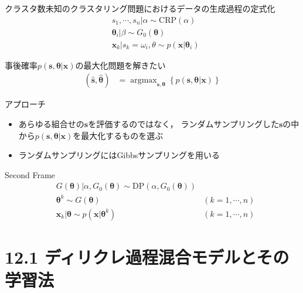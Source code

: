 \documentclass[10pt,fleqn]{beamer}
\DeclareMathOperator*{\argmax}{argmax}
\begin{document}
    \begin{frame}{クラスタ数未知のクラスタリング問題におけるデータの生成過程の定式化}
        \begin{align*}
            &s_1,\cdots,s_n | \alpha \sim \mathrm{CRP}(\alpha) \tag{12.4}\\
            &\bm\theta_i | \beta \sim G_0(\bm\theta) \tag{12.5}\\
            &\mathbf x_k | s_k = \omega_i,\theta \sim p(\mathbf x | \bm\theta_i) \tag{12.6} 
        \end{align*}
    \end{frame}
    
    \begin{frame}{事後確率$p(\mathbf s, \bm\theta | \mathbf x)$の最大化問題を解きたい}
        \begin{align*}
            (\hat{\mathbf s}, \hat{\bm\theta}) &= \argmax_{\mathbf s,\bm\theta}\left\{ p(\mathbf s, \bm\theta | \mathbf x) \right\} \tag{11.5}
        \end{align*}
        \begin{alertblock}{アプローチ}
            \begin{itemize}
                \item あらゆる組合せの$\mathbf s$を評価するのではなく，
                    ランダムサンプリングした$\mathbf s$の中から$p(\mathbf s, \bm\theta | \mathbf x)$を最大化するものを選ぶ
                \item ランダムサンプリングにはGibbsサンプリングを用いる
            \end{itemize}
        \end{alertblock}
    \end{frame}
    
    \begin{frame}{Second Frame}
        \begin{align}
            &G(\bm \theta) | \alpha, G_0(\bm \theta) \sim \mathrm{DP}(\alpha, G_0(\bm \theta)) \tag{12.1}\\
            &\bm \theta^k  \sim G(\bm \theta) & (k = 1,\cdots,n) \tag{12.2}\\
            &\mathbf x_k|\bm\theta \sim p(\mathbf x|\bm \theta^k) & (k = 1,\cdots,n) \tag{12.3}
        \end{align}
    \end{frame}
    \section{12.1 ディリクレ過程混合モデルとその学習法}
\end{document}
